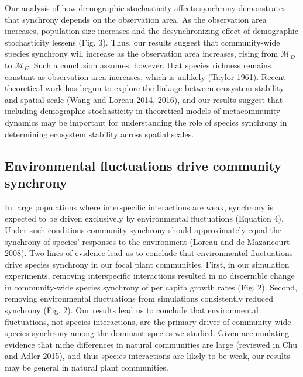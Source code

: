 \documentclass[12pt,]{article}
\begin{document}
Our analysis of how demographic stochasticity affects synchrony
demonstrates that synchrony depends on the observation area. As the
observation area increases, population size increases and the
desynchronizing effect of demographic stochasticity lessens (Fig. 3).
Thus, our results suggest that community-wide species synchrony will
increase as the observation area increases, rising from
\(\mathcal{M}_D\) to \(\mathcal{M}_E\). Such a conclusion assumes,
however, that species richness remains constant as observation area
increases, which is unlikely (Taylor 1961). Recent theoretical work has
begun to explore the linkage between ecosystem stability and spatial
scale (Wang and Loreau 2014, 2016), and our results suggest that
including demographic stochasticity in theoretical models of
metacommunity dynamics may be important for understanding the role of
species synchrony in determining ecosystem stability across spatial
scales.

\subsection{Environmental fluctuations drive community synchrony}

In large populations where interspecific interactions are weak,
synchrony is expected to be driven exclusively by environmental
fluctuations (Equation 4). Under such conditions community synchrony
should approximately equal the synchrony of species' responses to the
environment (Loreau and {{de Mazancourt}} 2008). Two lines of evidence
lead us to conclude that environmental fluctuations drive species
synchrony in our focal plant communities. First, in our simulation
experiments, removing interspecific interactions resulted in no
discernible change in community-wide species synchrony of per capita
growth rates (Fig. 2). Second, removing environmental fluctuations from
simulations consistently reduced synchrony (Fig. 2). Our results lead us
to conclude that environmental fluctuations, not species interactions,
are the primary driver of community-wide species synchrony
among the dominant species we studied. Given
accumulating evidence that niche differences in natural communities are
large (reviewed in Chu and Adler 2015), and thus species interactions
are likely to be weak, our results may be general in natural plant
communities.
\end{document}
